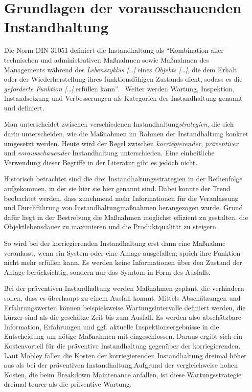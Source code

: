 \chapter{Grundlagen der vorausschauenden Instandhaltung}
\label{ch:grundlagen_pdm}

Die Norm DIN 31051 definiert die Instandhaltung als \enquote{Kombination aller technischen und administrativen Maßnahmen sowie Maßnahmen des Managements während des \textit{Lebenszyklus […]} eines \textit{Objekts […]}, die dem Erhalt oder der Wiederherstellung ihres funktionsfähigen Zustands dient, sodass es die \textit{geforderte Funktion […]} erfüllen kann}.~\cite[S.~4]{DIN.2019} Weiter werden Wartung, Inspektion, Instandsetzung und Verbesserungen als Kategorien der Instandhaltung genannt und definiert. 

Man unterscheidet zwischen verschiedenen Instandhaltung\textit{strategien}, die sich darin unterscheiden, wie die Maßnahmen im Rahmen der Instandhaltung konkret umgesetzt werden. Heute wird der Regel zwischen \textit{korriegierender}, \textit{präventiver} und \textit{vorausschauender} Instandhaltung unterschieden. Eine einheitliche Verwendung dieser Begriffe in der Literatur gibt es jedoch nicht.

Historisch betrachtet sind die drei  Instandhaltungsstrategien in der Reihenfolge aufgekommen, in der sie hier sie hier genannt sind. Dabei konnte der Trend beobachtet werden, dass zunehmend mehr Informationen für die Veranlassung und Durchführung von Instandhaltungmaßnahmen herangezogen wurde. Grund dafür liegt in der Bestrebung die Maßnahmen möglichst effizient zu gestalten, die Objektlebensdauer zu maximieren und die Produktqualität zu steigern. 

So wird bei der korriegierenden Instandhaltung erst dann eine Maßnahme veranlasst, wenn ein System oder eine Anlage ausgefallen; sprich ihre Funktion nicht mehr erfüllen kann. Es werden keine Informationen über den Zustand der Anlage berücksichtig, sondern nur das Symtom in Form des Ausfalls.

Bei der präventiven Instandhaltung werden Maßnahmen geplant, die verhindern sollen, dass es überhaupt zu einem Ausfall kommt. Mittels Abschätzungen und Erfahrungswerten können beispielsweise Wartungsintervalle definiert werden, die kürzer sind als die geschätze Zeit bis zum Ausfall. Es werden also abschätzbare Information, Erfahrungen und ggf. aktuelle Inspektionsergebnisse in die Entscheidung um nötige Maßnahmen mit eingeschlossen. Daraus ergibt sich ein Kostenvorteil für die präventive Instandhaltung gegenüber der korriegierenden. Laut Mobley fallen die Kosten der korriegierenden Instandhaltung dreimal höher aus als bei der präventiven Instandhaltung.Aufgrund der vergleichweise hohen Kosten, die beim Breakdown Maintenance anfallen, ist diese Wartungsstrategie dreimal teurer als die präventive Wartung.~\cite[S.~3]{Mobley.2002}

